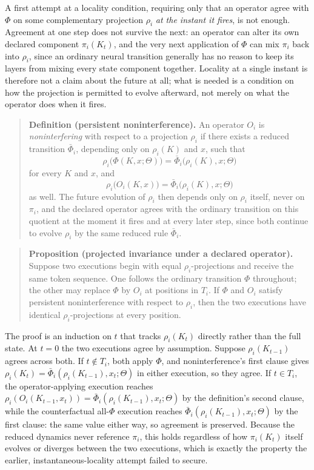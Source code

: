 \documentclass[11pt]{article}
\begin{document}
A first attempt at a locality condition, requiring only that an operator agree with $\Phi$ on some complementary projection $\rho_i$ \emph{at the instant it fires}, is not enough. Agreement at one step does not survive the next: an operator can alter its own declared component $\pi_i(K_t)$, and the very next application of $\Phi$ can mix $\pi_i$ back into $\rho_i$, since an ordinary neural transition generally has no reason to keep its layers from mixing every state component together. Locality at a single instant is therefore not a claim about the future at all; what is needed is a condition on how the projection is permitted to evolve afterward, not merely on what the operator does when it fires.

\begin{quote}
\textbf{Definition (persistent noninterference).} An operator $O_i$ is \emph{noninterfering} with respect to a projection $\rho_i$ if there exists a reduced transition $\bar\Phi_i$, depending only on $\rho_i(K)$ and $x$, such that
\[
\rho_i\big(\Phi(K, x; \Theta)\big) = \bar\Phi_i\big(\rho_i(K), x; \Theta\big)
\]
for every $K$ and $x$, and
\[
\rho_i\big(O_i(K, x)\big) = \bar\Phi_i\big(\rho_i(K), x; \Theta\big)
\]
as well. The future evolution of $\rho_i$ then depends only on $\rho_i$ itself, never on $\pi_i$, and the declared operator agrees with the ordinary transition on this quotient at the moment it fires and at every later step, since both continue to evolve $\rho_i$ by the same reduced rule $\bar\Phi_i$.
\end{quote}

\begin{quote}
\textbf{Proposition (projected invariance under a declared operator).} Suppose two executions begin with equal $\rho_i$-projections and receive the same token sequence. One follows the ordinary transition $\Phi$ throughout; the other may replace $\Phi$ by $O_i$ at positions in $T_i$. If $\Phi$ and $O_i$ satisfy persistent noninterference with respect to $\rho_i$, then the two executions have identical $\rho_i$-projections at every position.
\end{quote}

The proof is an induction on $t$ that tracks $\rho_i(K_t)$ directly rather than the full state. At $t=0$ the two executions agree by assumption. Suppose $\rho_i(K_{t-1})$ agrees across both. If $t \notin T_i$, both apply $\Phi$, and noninterference's first clause gives $\rho_i(K_t) = \bar\Phi_i(\rho_i(K_{t-1}), x_t; \Theta)$ in either execution, so they agree. If $t \in T_i$, the operator-applying execution reaches $\rho_i(O_i(K_{t-1}, x_t)) = \bar\Phi_i(\rho_i(K_{t-1}), x_t; \Theta)$ by the definition's second clause, while the counterfactual all-$\Phi$ execution reaches $\bar\Phi_i(\rho_i(K_{t-1}), x_t; \Theta)$ by the first clause: the same value either way, so agreement is preserved. Because the reduced dynamics never reference $\pi_i$, this holds regardless of how $\pi_i(K_t)$ itself evolves or diverges between the two executions, which is exactly the property the earlier, instantaneous-locality attempt failed to secure.
\end{document}
